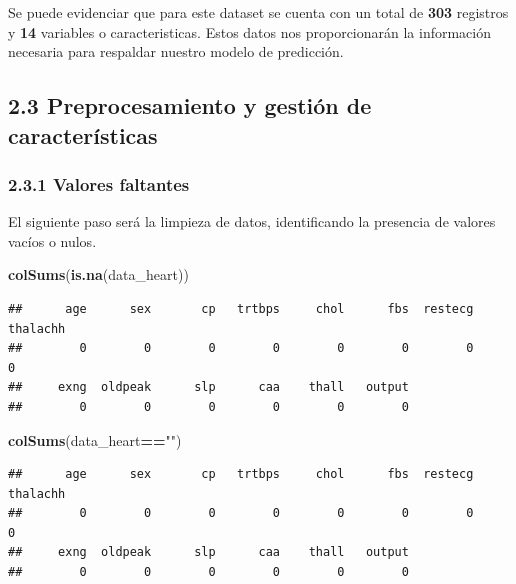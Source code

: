 \documentclass[
]{article}
\newenvironment{Shaded}{\begin{snugshade}}{\end{snugshade}}
\newcommand{\FunctionTok}[1]{\textcolor[rgb]{0.13,0.29,0.53}{\textbf{#1}}}
\newcommand{\NormalTok}[1]{#1}
\newcommand{\SpecialCharTok}[1]{\textcolor[rgb]{0.81,0.36,0.00}{\textbf{#1}}}
\newcommand{\StringTok}[1]{\textcolor[rgb]{0.31,0.60,0.02}{#1}}
\begin{document}
Se puede evidenciar que para este dataset se cuenta con un total de
\textbf{303} registros y \textbf{14} variables o caracteristicas. Estos
datos nos proporcionarán la información necesaria para respaldar nuestro
modelo de predicción.

\hypertarget{preprocesamiento-y-gestiuxf3n-de-caracteruxedsticas}{%
\subsection{2.3 Preprocesamiento y gestión de
características}\label{preprocesamiento-y-gestiuxf3n-de-caracteruxedsticas}}

\hypertarget{valores-faltantes}{%
\subsubsection{2.3.1 Valores faltantes}\label{valores-faltantes}}

El siguiente paso será la limpieza de datos, identificando la presencia
de valores vacíos o nulos.

\begin{Shaded}
\begin{Highlighting}[]
\FunctionTok{colSums}\NormalTok{(}\FunctionTok{is.na}\NormalTok{(data\_heart))}
\end{Highlighting}
\end{Shaded}

\begin{verbatim}
##      age      sex       cp   trtbps     chol      fbs  restecg thalachh 
##        0        0        0        0        0        0        0        0 
##     exng  oldpeak      slp      caa    thall   output 
##        0        0        0        0        0        0
\end{verbatim}

\begin{Shaded}
\begin{Highlighting}[]
\FunctionTok{colSums}\NormalTok{(data\_heart}\SpecialCharTok{==}\StringTok{""}\NormalTok{)}
\end{Highlighting}
\end{Shaded}

\begin{verbatim}
##      age      sex       cp   trtbps     chol      fbs  restecg thalachh 
##        0        0        0        0        0        0        0        0 
##     exng  oldpeak      slp      caa    thall   output 
##        0        0        0        0        0        0
\end{verbatim}
\end{document}
